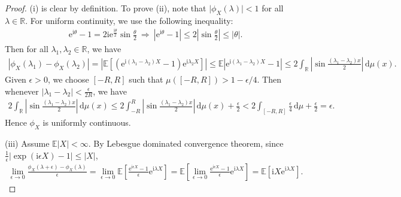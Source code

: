 \documentclass{article}
\numberwithin{equation}{section}
\newcommand{\e}{\mathrm{e}}
\newcommand{\E}{\mathbb{E}}
\renewcommand{\d}{\mathrm{d}}
\renewcommand{\i}{\mathrm{i}}
\theoremstyle{plain}
\theoremstyle{definition}
\begin{document}
\begin{proof}
(i) is clear by definition. To prove (ii), note that $\vert\phi_X(\lambda)\vert<1$ for all $\lambda\in\mathbb{R}$. For uniform continuity, we use the following inequality:
\begin{align*}
	\e^{\i\theta} - 1 = 2\i\e^{\frac{\i\theta}{2}}\sin\frac{\theta}{2}\ \Rightarrow\ \left\vert\e^{\i\theta}-1\right\vert\leq 2\left\vert\sin\frac{\theta}{2}\right\vert\leq\vert\theta\vert.
\end{align*}
Then for all $\lambda_1,\lambda_2\in\mathbb{R}$, we have
\begin{align*}
	\left\vert\phi_X(\lambda_1)-\phi_X(\lambda_2)\right\vert=\left\vert\E\left[\left(\e^{\i(\lambda_1-\lambda_2)X}-1\right)\e^{\i\lambda_2X}\right]\right\vert\leq\E\left\vert\e^{\i(\lambda_1-\lambda_2)X}-1\right\vert\leq2\int_\mathbb{R}\left\vert\sin\frac{(\lambda_1-\lambda_2)x}{2}\right\vert\,\d \mu(x). \tag{2.14}\label{eq:2.14}
\end{align*}
Given $\epsilon>0$, we choose $[-R,R]$ such that $\mu([-R,R])>1-\epsilon/4$. Then whenever $\vert\lambda_1-\lambda_2\vert<\frac{\epsilon}{2R}$, we have
\begin{align*}
	2\int_\mathbb{R}\left\vert\sin\frac{(\lambda_1-\lambda_2)x}{2}\right\vert\,\d \mu(x)\leq 2\int_{-R}^R\left\vert\sin\frac{(\lambda_1-\lambda_2)x}{2}\right\vert\,\d \mu(x) + \frac{\epsilon}{2} < 2\int_{[-R,R]}\frac{\epsilon}{4}\,\d \mu + \frac{\epsilon}{2} = \epsilon.\tag{2.15}\label{eq:2.15}
\end{align*}
Hence $\phi_X$ is uniformly continuous. \vspace{0.1cm}

(iii) Assume $\E\vert X\vert < \infty$. By Lebesgue dominated convergence theorem, since $\frac{1}{\epsilon}\left\vert\exp(\i\epsilon X)-1\right\vert\leq\vert X\vert$,
\begin{align*}
	\lim_{\epsilon\to 0}\frac{\phi_X(\lambda+\epsilon)-\phi_X(\lambda)}{\epsilon} = \lim_{\epsilon\to 0}\E\left[\frac{\e^{\i\epsilon X}-1}{\epsilon}\e^{\i\lambda X}\right] = \E\left[\lim_{\epsilon\to 0}\frac{\e^{\i\epsilon X}-1}{\epsilon}\e^{\i\lambda X}\right] = \E\left[\i X\e^{\i\lambda X}\right].
\end{align*}


\end{proof}
\end{document}
